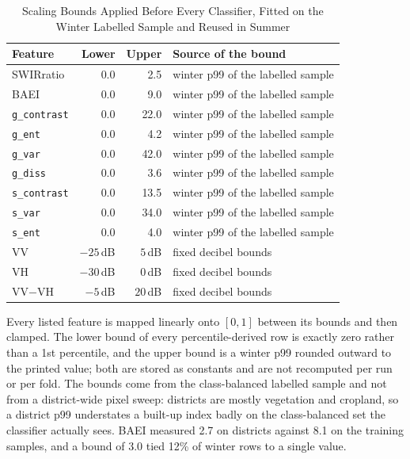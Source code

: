 \documentclass[conference]{IEEEtran}
\begin{document}
\begin{table}[!htbp]
\caption{Scaling Bounds Applied Before Every Classifier, Fitted on the Winter Labelled Sample and Reused in Summer}
\label{tab_scales}
\begin{center}
\setlength{\tabcolsep}{4pt}
\begin{tabular}{@{}lrrl@{}}
\toprule
\textbf{Feature} & \textbf{Lower} & \textbf{Upper} & \textbf{Source of the bound} \\
\midrule
SWIRratio    & 0.0 & 2.5  & winter p99 of the labelled sample \\
BAEI         & 0.0 & 9.0  & winter p99 of the labelled sample \\
\texttt{g\_contrast} & 0.0 & 22.0 & winter p99 of the labelled sample \\
\texttt{g\_ent}      & 0.0 & 4.2  & winter p99 of the labelled sample \\
\texttt{g\_var}      & 0.0 & 42.0 & winter p99 of the labelled sample \\
\texttt{g\_diss}     & 0.0 & 3.6  & winter p99 of the labelled sample \\
\texttt{s\_contrast} & 0.0 & 13.5 & winter p99 of the labelled sample \\
\texttt{s\_var}      & 0.0 & 34.0 & winter p99 of the labelled sample \\
\texttt{s\_ent}      & 0.0 & 4.0  & winter p99 of the labelled sample \\
\midrule
VV  & $-25$\,dB & $5$\,dB  & fixed decibel bounds \\
VH  & $-30$\,dB & $0$\,dB  & fixed decibel bounds \\
VV$-$VH & $-5$\,dB & $20$\,dB & fixed decibel bounds \\
\bottomrule
\end{tabular}

\vspace{2pt}
\parbox{\columnwidth}{\footnotesize Every listed feature is mapped linearly onto $[0,1]$ between its bounds and then clamped. The lower bound of every percentile-derived row is exactly zero rather than a 1st percentile, and the upper bound is a winter p99 rounded outward to the printed value; both are stored as constants and are not recomputed per run or per fold. The bounds come from the class-balanced labelled sample and not from a district-wide pixel sweep: districts are mostly vegetation and cropland, so a district p99 understates a built-up index badly on the class-balanced set the classifier actually sees. BAEI measured 2.7 on districts against 8.1 on the training samples, and a bound of 3.0 tied 12\% of winter rows to a single value.}
\end{center}
\end{table}
\end{document}
